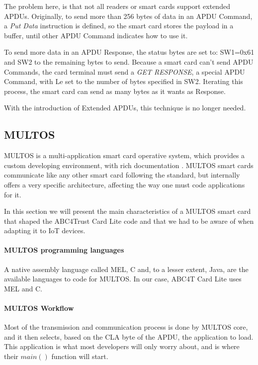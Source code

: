 The problem here, is that not all readers or smart cards support extended APDUs. Originally, to send more than 256 bytes of data in an APDU Command, a \textit{Put Data} instruction is defined, so the smart card stores the payload in a buffer, until other APDU Command indicates how to use it.

To send more data in an APDU Response, the status bytes are set to: SW1=0x61 and SW2 to the remaining bytes to send. Because a smart card can't send APDU Commands, the card terminal must send a \textit{GET RESPONSE}, a special APDU Command, with Le set to the number of bytes specified in SW2. Iterating this process, the smart card can send as many bytes as it wants as Response.

With the introduction of Extended APDUs, this technique is no longer needed.






\subsection{MULTOS}

MULTOS is a multi-application smart card operative system, which provides a custom developing environment, with rich documentation \citep{MultosTechLib}. MULTOS smart cards communicate like any other smart card following the standard, but internally offers a very specific architecture, affecting the way one must code applications for it.

In this section we will present the main characteristics of a MULTOS smart card that shaped the ABC4Trust Card Lite code and that we had to be aware of when adapting it to IoT devices.

\paragraph{MULTOS programming languages} A native assembly language called MEL, C and, to a lesser extent, Java, are the available languages to code for MULTOS. In our case, ABC4T Card Lite uses MEL and C.

\paragraph{MULTOS Workflow}

Most of the transmission and communication process is done by MULTOS core, and it then selects, based on the CLA byte of the APDU, the application to load. This application is what most developers will only worry about, and is where their $main()$ function will start.

